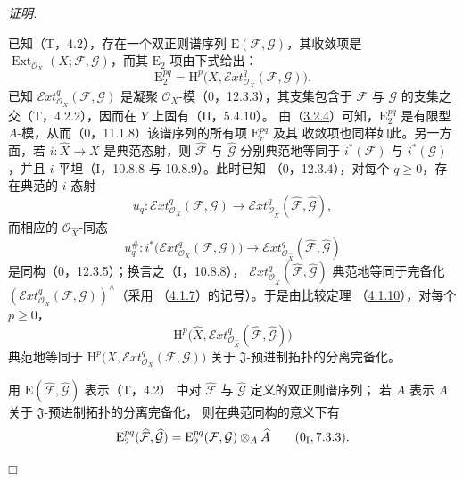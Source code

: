 \documentclass[UTF8,fontset=none,11pt,oneside,openany]{ctexbook}
\providecommand{\square}{\mdlgwhtsquare}
\newenvironment{proof}{%
  \par\smallskip\noindent\textit{证明.}\ %
}{\hfill$\square$\par}
\newcommand{\oldpage}[2][]{%
  \hypertarget{ega-source-page-#1-#2}{}%
  \marginnote{\scriptsize\textbf{#1}~|~#2}\ignorespaces}
\begin{document}
\begin{proof}
已知（T，4.2），存在一个双正则谱序列
$\mathrm E(\mathcal F,\mathcal G)$，其收敛项是
$\operatorname{Ext}_{\mathcal O_X}(X;\mathcal F,\mathcal G)$，而其
$\mathrm E_2$ 项由下式给出：
\[
\mathrm E_2^{pq}=\mathrm H^p\bigl(X,
\mathcal{E}\!xt^q_{\mathcal O_X}(\mathcal F,\mathcal G)\bigr).
\]
已知 $\mathcal{E}\!xt^q_{\mathcal O_X}(\mathcal F,\mathcal G)$ 是凝聚
$\mathcal O_X$-模（0，12.3.3），其支集包含于 $\mathcal F$ 与
$\mathcal G$ 的支集之交（T，4.2.2），因而在 $Y$ 上固有（II，5.4.10）。
由（\hyperref[III.3.2.4-fr]{3.2.4}）可知，$\mathrm E_2^{pq}$ 是有限型
$A$-模，从而（0，11.1.8）该谱序列的所有项 $\mathrm E_r^{pq}$ 及其
收敛项也同样如此。另一方面，若
$i:\widehat X\to X$ 是典范态射，则 $\widehat{\mathcal F}$ 与
$\widehat{\mathcal G}$ 分别典范地等同于 $i^*(\mathcal F)$ 与
$i^*(\mathcal G)$，并且 $i$ 平坦（I，10.8.8 与 10.8.9）。此时已知
（0，12.3.4），对每个 $q\geq0$，存在典范的 $i$-态射
\[
u_q:\mathcal{E}\!xt^q_{\mathcal O_X}(\mathcal F,\mathcal G)
\longrightarrow
\mathcal{E}\!xt^q_{\mathcal O_{\widehat X}}
(\widehat{\mathcal F},\widehat{\mathcal G}),
\]
而相应的 $\mathcal O_{\widehat X}$-同态
\[
u_q^\#:i^*\bigl(\mathcal{E}\!xt^q_{\mathcal O_X}(\mathcal F,\mathcal G)\bigr)
\longrightarrow
\mathcal{E}\!xt^q_{\mathcal O_{\widehat X}}
(\widehat{\mathcal F},\widehat{\mathcal G})
\]
是同构（0，12.3.5）；换言之（I，10.8.8），
$\mathcal{E}\!xt^q_{\mathcal O_{\widehat X}}
(\widehat{\mathcal F},\widehat{\mathcal G})$ 典范地等同于完备化
$(\mathcal{E}\!xt^q_{\mathcal O_X}(\mathcal F,\mathcal G))^\wedge$（采用
（\hyperref[III.4.1.7-fr]{4.1.7}）的记号）。于是由比较定理
（\hyperref[III.4.1.10-fr]{4.1.10}），对每个 $p\geq0$，
\[
\mathrm H^p\bigl(\widehat X,
\mathcal{E}\!xt^q_{\mathcal O_{\widehat X}}
(\widehat{\mathcal F},\widehat{\mathcal G})\bigr)
\]
典范地等同于
$\mathrm H^p\bigl(X,\mathcal{E}\!xt^q_{\mathcal O_X}
(\mathcal F,\mathcal G)\bigr)$ 关于 $\mathfrak J$-预进制拓扑的分离完备化。

\oldpage[III]{139}

用 $\mathrm E(\widehat{\mathcal F}, \widehat{\mathcal G})$ 表示（T，4.2）
中对 $\widehat{\mathcal F}$ 与 $\widehat{\mathcal G}$ 定义的双正则谱序列；
若 $\widehat A$ 表示 $A$ 关于 $\mathfrak J$-预进制拓扑的分离完备化，
则在典范同构的意义下有
\[
\mathrm E_2^{pq}(\widehat{\mathcal F},\widehat{\mathcal G})
=\mathrm E_2^{pq}(\mathcal F,\mathcal G)\otimes_A\widehat A
\qquad (0\textsubscript{I}, 7.3.3).
\]


\end{proof}
\end{document}
